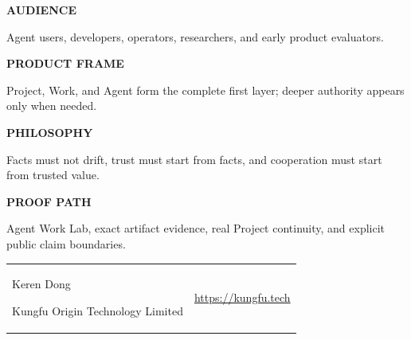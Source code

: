 \documentclass[10pt]{article}
\begin{document}
\begin{titlepage}
\vspace{0.22in}
\begin{minipage}[t]{0.485\textwidth}
  \begin{darkcard}
    {\sffamily\bfseries\footnotesize\color{Cyan}AUDIENCE}\par
    {\scriptsize\color{PaperCool}Agent users, developers, operators,
    researchers, and early product evaluators.}
  \end{darkcard}
\end{minipage}
\hfill
\begin{minipage}[t]{0.485\textwidth}
  \begin{darkcard}
    {\sffamily\bfseries\footnotesize\color{Cyan}PRODUCT FRAME}\par
    {\scriptsize\color{PaperCool}Project, Work, and Agent form the complete
    first layer; deeper authority appears only when needed.}
  \end{darkcard}
\end{minipage}

\vspace{0.08in}
\begin{minipage}[t]{0.485\textwidth}
  \begin{darkcard}
    {\sffamily\bfseries\footnotesize\color{Cyan}PHILOSOPHY}\par
    {\scriptsize\color{PaperCool}Facts must not drift, trust must start from
    facts, and cooperation must start from trusted value.}
  \end{darkcard}
\end{minipage}
\hfill
\begin{minipage}[t]{0.485\textwidth}
  \begin{darkcard}
    {\sffamily\bfseries\footnotesize\color{Cyan}PROOF PATH}\par
    {\scriptsize\color{PaperCool}Agent Work Lab, exact artifact evidence,
    real Project continuity, and explicit public claim boundaries.}
  \end{darkcard}
\end{minipage}

\vfill
\begin{tabularx}{\textwidth}{@{}Xr@{}}
  {\sffamily\color{PaperCool}Keren Dong\par
   \footnotesize Kungfu Origin Technology Limited} &
  {\sffamily\footnotesize\color{Cyan}
   \href{https://kungfu.tech}{https://kungfu.tech}}
\end{tabularx}
\end{titlepage}
\pagecolor{Paper}













\nocite{kungfuRuntime,kungfuBuildchain}
\begingroup
\small
\setlength{\parskip}{0.2em}


\endgroup
\end{document}
